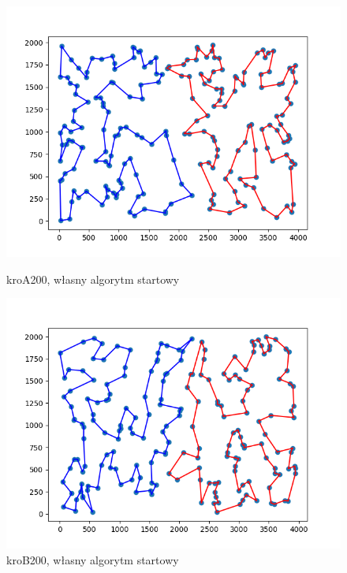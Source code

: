 \documentclass[11pt]{article}
\begin{document}
\begin{figure}[H]
    \vspace{0.5cm}

    \begin{minipage}[t]{0.45\textwidth}
        \centering
        \includegraphics[width=\linewidth]{best_paths/kroA200/traverse_steepest_edge/split_paths_regret_TSP}
        \caption{kroA200, własny algorytm startowy}
    \end{minipage}
    \hfill
    \begin{minipage}[t]{0.45\textwidth}
        \centering
        \includegraphics[width=\linewidth]{best_paths/kroB200/traverse_steepest_edge/split_paths_regret_TSP}
        \caption{kroB200, własny algorytm startowy}
    \end{minipage}
    \label{fig:minipage-steepest-edge}
\end{figure}
\end{document}
